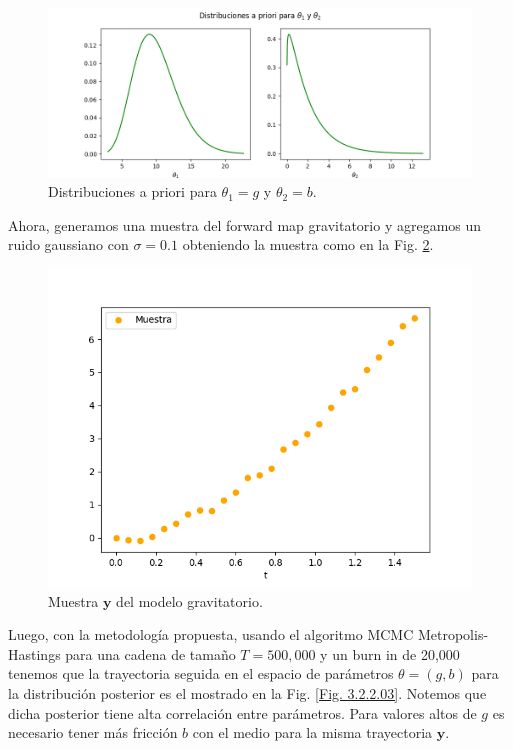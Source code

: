 \begin{figure}[H] 
    \centering 
    \includegraphics[width = 15 cm]{img/Exp_Central_gravedad/Figuras/Generales/Apriori_gravedad.png}     
    \caption{Distribuciones a priori para $\theta_1 = g$ y $\theta_2 = b$.}
    \label{Fig. 3.2.2.01}
\end{figure} 

Ahora, generamos una muestra del forward map gravitatorio y agregamos un ruido gaussiano con $\sigma = 0.1$ obteniendo la muestra como en la Fig. \ref{Fig. 3.2.2.02}.

\begin{figure}[H] 
    \centering 
    \includegraphics[width = 10 cm ]{img/Exp_Central_gravedad/Figuras/Generales/Muestra_gravedad.png} 
    \caption{Muestra $\mathbf{y}$ del modelo gravitatorio.}
    \label{Fig. 3.2.2.02}
\end{figure} 

Luego, con la metodología propuesta, usando el algoritmo MCMC Metropolis-Hastings para una cadena de tamaño $T = 500,000$ y un burn in de 20,000 tenemos que la trayectoria seguida en el espacio de parámetros $\theta = (g,b)$ para la distribución posterior es el mostrado en la Fig. \ref{Fig. 3.2.2.03}. Notemos que dicha posterior tiene alta correlación entre parámetros. Para valores altos de $g$ es necesario tener más fricción $b$ con el medio para la misma trayectoria $\mathbf{y}$.

